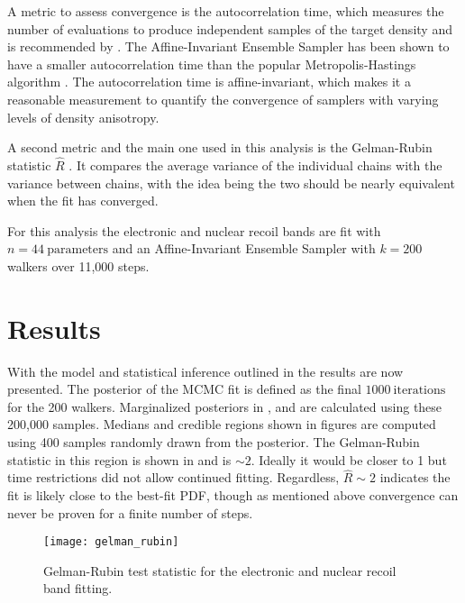 A metric to assess convergence is the autocorrelation time, which measures the number
of evaluations to produce independent samples of the target density and is recommended by .  The Affine-Invariant
Ensemble Sampler has been shown to have a smaller autocorrelation time than the popular Metropolis-Hastings algorithm
.  The autocorrelation time is affine-invariant, which makes it a reasonable measurement to quantify
the convergence of samplers with varying levels of density anisotropy.

A second metric and the main one used in
this analysis is the Gelman-Rubin statistic $\hat{R}$ .  It compares the average variance of the individual chains
with the variance between chains, with the idea being the two should be nearly equivalent when the fit has converged.

For this analysis the electronic and nuclear recoil bands are fit with  $n = 44\ \mathrm{parameters}$ and an Affine-Invariant Ensemble
Sampler with $k = 200$ walkers over 11,000 steps.



\section{Results}
\label{sec:er_nr_calibrations_results}
With the model and statistical inference outlined in  the results are now
presented.  The posterior of the MCMC fit is defined as the final $1000\ \mathrm{iterations}$ for the 200 walkers.  Marginalized
posteriors in ,  and
 are calculated using these 200,000 samples.  Medians and credible regions shown in
figures are computed using 400 samples randomly drawn from the posterior.  The Gelman-Rubin statistic in this region is
shown in  and is ${\sim}2$.  Ideally it would be closer to 1 but time restrictions did not allow
continued fitting.  Regardless, $\hat{R} \sim 2$ indicates the fit is likely close to the best-fit PDF, though as mentioned above
convergence can never be proven for a finite number of steps.

\begin{figure}
\centering
\texttt{[image: gelman\_rubin]}
\caption{Gelman-Rubin test statistic for the electronic and nuclear recoil band fitting.}
\label{fig:er_nr_calibrations_results_gr}
\end{figure}




